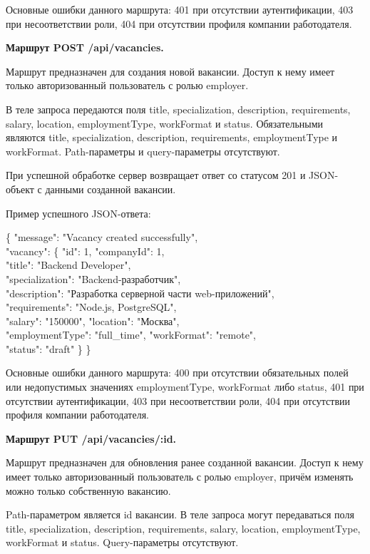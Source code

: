 Основные ошибки данного маршрута: 401 при отсутствии аутентификации, 403 при несоответствии роли, 404 при отсутствии профиля компании работодателя.

\textbf{Маршрут POST /api/vacancies.}

Маршрут предназначен для создания новой вакансии. Доступ к нему имеет только авторизованный пользователь с ролью employer.

В теле запроса передаются поля title, specialization, description, requirements, salary, location, employmentType, workFormat и status. Обязательными являются title, specialization, description, requirements, employmentType и workFormat. Path-параметры и query-параметры отсутствуют.

При успешной обработке сервер возвращает ответ со статусом 201 и JSON-объект с данными созданной вакансии.

Пример успешного JSON-ответа:

\begin{flushleft}
	\small\ttfamily
	\{ "message": "Vacancy created successfully",\\
	"vacancy": \{ "id": 1, "companyId": 1,\\
	"title": "Backend Developer",\\
	"specialization": "Backend-разработчик",\\
	"description": "Разработка серверной части web-приложений",\\
	"requirements": "Node.js, PostgreSQL",\\
	"salary": "150000", "location": "Москва",\\
	"employmentType": "full\_time", "workFormat": "remote",\\
	"status": "draft" \} \}
\end{flushleft}

Основные ошибки данного маршрута: 400 при отсутствии обязательных полей или недопустимых значениях employmentType, workFormat либо status, 401 при отсутствии аутентификации, 403 при несоответствии роли, 404 при отсутствии профиля компании работодателя.

\textbf{Маршрут PUT /api/vacancies/:id.}

Маршрут предназначен для обновления ранее созданной вакансии. Доступ к нему имеет только авторизованный пользователь с ролью employer, причём изменять можно только собственную вакансию.

Path-параметром является id вакансии. В теле запроса могут передаваться поля title, specialization, description, requirements, salary, location, employmentType, workFormat и status. Query-параметры отсутствуют.

